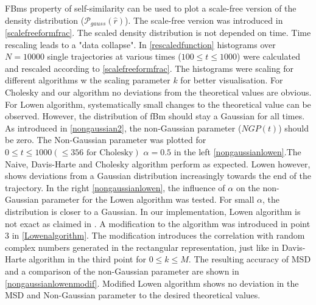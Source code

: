 \documentclass[
  a4paper,BCOR10mm,twoside,
  headsepline,footsepline,%
  fleqn,openbib
]{scrbook}
\begin{document}
FBms property of self-similarity can be used to plot a scale-free version of the density distribution ($\mathcal{P}_{gauss}(\hat{r})$). The scale-free version was introduced in \cref{scalefreeformfrac}. The scaled density distribution is not depended on time. Time rescaling leads to a "data collapse". In \cref{rescaledfunction}  histograms over $N=10000$ single trajectories at various times ($100\leq t \leq 1000$) were calculated and rescaled according to \cref{scalefreeformfrac}. The histograms were scaling for different algorithms w  the scaling parameter $k$ for better visualisation. For Cholesky and our algorithm no deviations from the theoretical values are obvious. For Lowen algorithm, systematically small changes to the theoretical value can be observed. However, the distribution of fBm should stay a Gaussian for all times. As introduced in \cref{nongaussian2}, the non-Gaussian parameter ($NGP(t)$) should be zero. The Non-Gaussian parameter was plotted for $0 \leq t \leq 1000 (\leq 356 \text{ for Cholesky})$  $\alpha=0.5$ in the left \cref{nongaussianlowen}.The Naive, Davis-Harte and Cholesky algorithm perform as expected. Lowen however, shows deviations from a Gaussian distribution increasingly towards the end of the trajectory. In the right \cref{nongaussianlowen}, the influence of $\alpha$ on the non-Gaussian parameter for the Lowen algorithm was tested. For small $\alpha$, the distribution is closer to a Gaussian. In our implementation, Lowen algorithm is not exact as claimed in \cite{Lowen1999}. A modification to the algorithm  was introduced in point 3 in \cref{Lowenalgorithm}. The modification introduces the correlation with random complex numbers generated in the rectangular representation, just like in Davis-Harte algorithm in the third point for $ 0 \leq k \leq M $. The resulting accuracy of MSD and a comparison of the non-Gaussian parameter are shown in \cref{nongaussianlowenmodif}. Modified Lowen algorithm shows no deviation in the MSD and Non-Gaussian parameter to the desired theoretical values.
\end{document}

